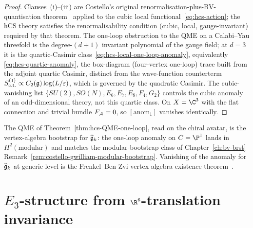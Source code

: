 \begin{proof}
Clauses~(i)--(iii) are Costello's original
renormalisation-plus-BV-quantisation
theorem~\cite[Ch.\,5,\,Thm.\,A]{CostelloRenormalization} applied to the
cubic local functional~\eqref{eq:hcs-action}; the hCS theory
satisfies the renormalisability condition (cubic, local,
gauge-invariant) required by that theorem. The one-loop obstruction to
the QME on a Calabi--Yau threefold is the degree-$(d+1)$ invariant
polynomial of the gauge field; at $d = 3$ it is the quartic-Casimir
class~\eqref{eq:hcs-local-one-loop-anomaly}, equivalently
\eqref{eq:hcs-quartic-anomaly},
the box-diagram (four-vertex one-loop) trace built from the adjoint
quartic Casimir, distinct from the wave-function counterterm
$S^{(1)}_{\mathrm{c.t.}}\propto C_2(\mathfrak{g})\log(L/\varepsilon)$, which is
governed by the quadratic Casimir. The cubic-vanishing list
$\{SU(2),SO(N),E_6,E_7,E_8,F_4,G_2\}$ controls the cubic anomaly of an
odd-dimensional theory, not this quartic class. On $X = \C^3$ with the
flat connection and trivial bundle $F_{\mathcal{A}} = 0$, so
$[\mathrm{anom}_1]$ vanishes identically.
\end{proof}

\begin{remark}
\label{rem:qme-chiral-avatar}
The QME of Theorem~\ref{thm:hcs-QME-one-loop}, read on the
chiral avatar, is the vertex-algebra bootstrap for $\widehat{\mathfrak{g}}_k$: the
one-loop anomaly on $C = \P^1$ lands in $H^2(\mathrm{modular})$ and
matches the modular-bootstrap class of
Chapter~\ref{ch:bv-brst}
Remark~\ref{rem:costello-gwilliam-modular-bootstrap}. Vanishing of
the anomaly for $\widehat{\mathfrak{g}}_k$ at generic level is the
Frenkel--Ben-Zvi vertex-algebra existence
theorem~\cite{FrenkelBenZvi2004}.
\end{remark}

\section{$E_3$-structure from $\R^6$-translation invariance}
\label{sec:hcs-e3}

